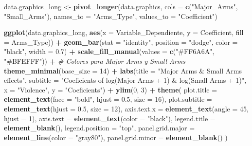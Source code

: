 \documentclass[
  11pt,
]{article}
\newenvironment{Shaded}{\begin{snugshade}}{\end{snugshade}}
\newcommand{\AttributeTok}[1]{\textcolor[rgb]{0.13,0.29,0.53}{#1}}
\newcommand{\CommentTok}[1]{\textcolor[rgb]{0.56,0.35,0.01}{\textit{#1}}}
\newcommand{\DecValTok}[1]{\textcolor[rgb]{0.00,0.00,0.81}{#1}}
\newcommand{\FloatTok}[1]{\textcolor[rgb]{0.00,0.00,0.81}{#1}}
\newcommand{\FunctionTok}[1]{\textcolor[rgb]{0.13,0.29,0.53}{\textbf{#1}}}
\newcommand{\NormalTok}[1]{#1}
\newcommand{\OtherTok}[1]{\textcolor[rgb]{0.56,0.35,0.01}{#1}}
\newcommand{\SpecialCharTok}[1]{\textcolor[rgb]{0.81,0.36,0.00}{\textbf{#1}}}
\newcommand{\StringTok}[1]{\textcolor[rgb]{0.31,0.60,0.02}{#1}}
\begin{document}
\begin{Shaded}
\begin{Highlighting}[]
\NormalTok{data.graphics\_long }\OtherTok{\textless{}{-}} \FunctionTok{pivot\_longer}\NormalTok{(data.graphics, }\AttributeTok{cols =} \FunctionTok{c}\NormalTok{(}\StringTok{"Major\_Arms"}\NormalTok{, }\StringTok{"Small\_Arms"}\NormalTok{), }
                          \AttributeTok{names\_to =} \StringTok{"Arms\_Type"}\NormalTok{, }\AttributeTok{values\_to =} \StringTok{"Coefficient"}\NormalTok{)}

\FunctionTok{ggplot}\NormalTok{(data.graphics\_long, }\FunctionTok{aes}\NormalTok{(}\AttributeTok{x =}\NormalTok{ Variable\_Dependiente, }\AttributeTok{y =}\NormalTok{ Coefficient, }\AttributeTok{fill =}\NormalTok{ Arms\_Type)) }\SpecialCharTok{+}
  \FunctionTok{geom\_bar}\NormalTok{(}\AttributeTok{stat =} \StringTok{"identity"}\NormalTok{, }\AttributeTok{position =} \StringTok{"dodge"}\NormalTok{, }\AttributeTok{color =} \StringTok{"black"}\NormalTok{, }\AttributeTok{width =} \FloatTok{0.7}\NormalTok{) }\SpecialCharTok{+}
  \FunctionTok{scale\_fill\_manual}\NormalTok{(}\AttributeTok{values =} \FunctionTok{c}\NormalTok{(}\StringTok{"\#FF6A6A"}\NormalTok{, }\StringTok{"\#BFEFFF"}\NormalTok{)) }\SpecialCharTok{+}  \CommentTok{\# Colores para Major Arms y Small Arms}
  \FunctionTok{theme\_minimal}\NormalTok{(}\AttributeTok{base\_size =} \DecValTok{14}\NormalTok{) }\SpecialCharTok{+}
  \FunctionTok{labs}\NormalTok{(}\AttributeTok{title =} \StringTok{"Major Arms \& Small Arms effects"}\NormalTok{,}
       \AttributeTok{subtitle =} \StringTok{"Coeficients of log(Major Arms + 1) \& log(Small Arms + 1)"}\NormalTok{,}
       \AttributeTok{x =} \StringTok{"Violence"}\NormalTok{,}
       \AttributeTok{y =} \StringTok{"Coeficients"}\NormalTok{) }\SpecialCharTok{+}
  \FunctionTok{ylim}\NormalTok{(}\DecValTok{0}\NormalTok{, }\DecValTok{3}\NormalTok{) }\SpecialCharTok{+}
  \FunctionTok{theme}\NormalTok{(}
    \AttributeTok{plot.title =} \FunctionTok{element\_text}\NormalTok{(}\AttributeTok{face =} \StringTok{"bold"}\NormalTok{, }\AttributeTok{hjust =} \FloatTok{0.5}\NormalTok{, }\AttributeTok{size =} \DecValTok{16}\NormalTok{),}
    \AttributeTok{plot.subtitle =} \FunctionTok{element\_text}\NormalTok{(}\AttributeTok{hjust =} \FloatTok{0.5}\NormalTok{, }\AttributeTok{size =} \DecValTok{12}\NormalTok{),}
    \AttributeTok{axis.text.x =} \FunctionTok{element\_text}\NormalTok{(}\AttributeTok{angle =} \DecValTok{45}\NormalTok{, }\AttributeTok{hjust =} \DecValTok{1}\NormalTok{),}
    \AttributeTok{axis.text =} \FunctionTok{element\_text}\NormalTok{(}\AttributeTok{color =} \StringTok{"black"}\NormalTok{),}
    \AttributeTok{legend.title =} \FunctionTok{element\_blank}\NormalTok{(),}
    \AttributeTok{legend.position =} \StringTok{"top"}\NormalTok{,}
    \AttributeTok{panel.grid.major =} \FunctionTok{element\_line}\NormalTok{(}\AttributeTok{color =} \StringTok{"gray80"}\NormalTok{),}
    \AttributeTok{panel.grid.minor =} \FunctionTok{element\_blank}\NormalTok{()}
\NormalTok{  )}
\end{Highlighting}
\end{Shaded}
\end{document}
